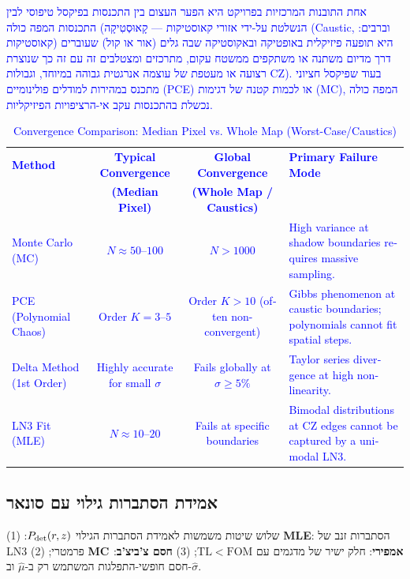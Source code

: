 \documentclass[12pt,a4paper]{article}
\newcommand{\TL}{\mathrm{TL}}
\DeclareRobustCommand{\aiedit}[1]{\textcolor{blue}{#1}}
\begin{document}
\aiedit{אחת התובנות המרכזיות בפרויקט היא הפער העצום בין התכנסות בפיקסל טיפוסי לבין
התכנסות המפה כולה (הנשלטת על-ידי אזורי קאוסטיקות --- קָאוּסְטִיקָה
(\textenglish{Caustic}, וברבים: קאוסטיקות) היא תופעה פיזיקלית באופטיקה ובאקוסטיקה
שבה גלים (אור או קול) שעוברים דרך מדיום משתנה או משתקפים ממשטח עקום, מתרכזים
ומצטלבים זה עם זה כך שנוצרת רצועה או מעטפת של עוצמה אנרגטית גבוהה במיוחד,
וגבולות CZ). בעוד שפיקסל
חציוני מתכנס במהירות למודלים פולינומיים (PCE) או לכמות קטנה של דגימות (MC),
המפה כולה נכשלת בהתכנסות עקב אי-הרציפויות הפיזיקליות.}

\aiedit{
\begin{table}[H]
  \centering
  \small
  \begin{english}
  \caption{Convergence Comparison: Median Pixel vs. Whole Map (Worst-Case/Caustics)}
  \label{tab:median_vs_global}
  \begin{tabular}{lccp{4.2cm}}
    \toprule
    \textbf{Method} & \textbf{Typical Convergence} & \textbf{Global Convergence} & \textbf{Primary Failure Mode} \\
     & \textbf{(Median Pixel)} & \textbf{(Whole Map / Caustics)} & \\
    \midrule
    Monte Carlo (MC)          & $N \approx 50$--$100$        & $N > 1000$                          & High variance at shadow boundaries requires massive sampling. \\
    PCE (Polynomial Chaos)    & Order $K = 3$--$5$          & Order $K > 10$ (often non-convergent) & Gibbs phenomenon at caustic boundaries; polynomials cannot fit spatial steps. \\
    Delta Method (1st Order)  & Highly accurate for small $\sigma$ & Fails globally at $\sigma \geq 5\%$ & Taylor series divergence at high non-linearity. \\
    LN3 Fit (MLE)             & $N \approx 10$--$20$         & Fails at specific boundaries         & Bimodal distributions at CZ edges cannot be captured by a unimodal LN3. \\
    \bottomrule
  \end{tabular}
  \end{english}
\end{table}
}

\subsection{אמידת הסתברות גילוי עם סונאר}
\label{sec:pdetect}

שלוש שיטות משמשות לאמידת הסתברות הגילוי $P_{\rm det}(r,z)$:
(1) \textbf{\textenglish{MLE}}: הסתברות זנב של \textenglish{LN3} פרמטרי;
(2) \textbf{\textenglish{MC} אמפירי}: חלק ישיר של מדגמים עם $\TL < \mathrm{FOM}$;
(3) \textbf{חסם צ'ביצ'ב}: חסם חופשי-התפלגות המשתמש רק ב-$\hat\mu$ וב-$\hat\sigma$.
\end{document}
